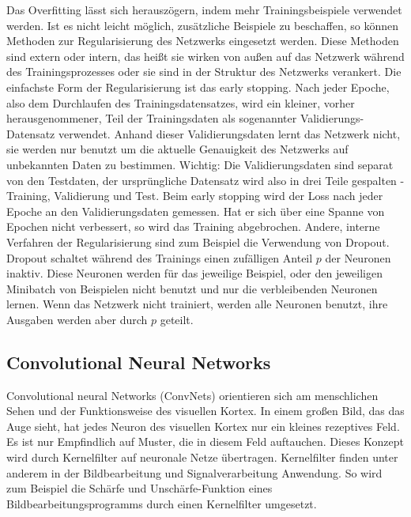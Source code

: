 Das Overfitting lässt sich herauszögern, indem mehr Trainingsbeispiele verwendet werden.
Ist es nicht leicht möglich, zusätzliche Beispiele zu beschaffen, so können Methoden zur Regularisierung des Netzwerks eingesetzt werden.
Diese Methoden sind extern oder intern, das heißt sie wirken von außen auf das Netzwerk während des Trainingsprozesses oder sie sind in der Struktur des Netzwerks verankert.
Die einfachste Form der Regularisierung ist das early stopping.
Nach jeder Epoche, also dem Durchlaufen des Trainingsdatensatzes, wird ein kleiner, vorher herausgenommener, Teil der Trainingsdaten als sogenannter Validierungs-Datensatz verwendet.
Anhand dieser Validierungsdaten lernt das Netzwerk nicht, sie werden nur benutzt um die aktuelle Genauigkeit des Netzwerks auf unbekannten Daten zu bestimmen.
Wichtig: Die Validierungsdaten sind separat von den Testdaten, der ursprüngliche Datensatz wird also in drei Teile gespalten - Training, Validierung und Test.
Beim early stopping wird der Loss nach jeder Epoche an den Validierungsdaten gemessen.
Hat er sich über eine Spanne von Epochen nicht verbessert, so wird das Training abgebrochen.
Andere, interne Verfahren der Regularisierung sind zum Beispiel die Verwendung von Dropout.
Dropout schaltet während des Trainings einen zufälligen Anteil $p$ der Neuronen inaktiv.
Diese Neuronen werden für das jeweilige Beispiel, oder den jeweiligen Minibatch von Beispielen nicht benutzt und nur die verbleibenden Neuronen lernen.
Wenn das Netzwerk nicht trainiert, werden alle Neuronen benutzt, ihre Ausgaben werden aber durch $p$ geteilt.


\subsection{Convolutional Neural Networks}


Convolutional neural Networks (ConvNets) orientieren sich am menschlichen Sehen und der Funktionsweise des visuellen Kortex.
In einem großen Bild, das das Auge sieht, hat jedes Neuron des visuellen Kortex nur ein kleines rezeptives Feld.
Es ist nur Empfindlich auf Muster, die in diesem Feld auftauchen.
Dieses Konzept wird durch Kernelfilter auf neuronale Netze übertragen.
Kernelfilter finden unter anderem in der Bildbearbeitung und Signalverarbeitung Anwendung.
So wird zum Beispiel die Schärfe und Unschärfe-Funktion eines Bildbearbeitungsprogramms durch einen Kernelfilter umgesetzt.


